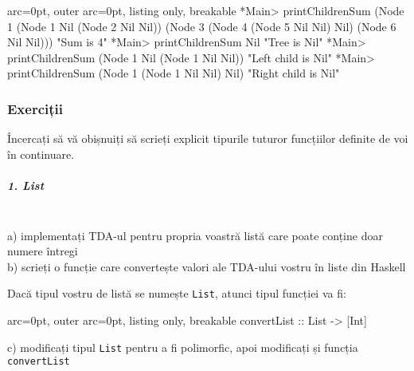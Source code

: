 \begin{tcblisting}{ arc=0pt, outer arc=0pt, listing only, breakable}
*Main> printChildrenSum (Node 1 (Node 1 Nil (Node 2 Nil Nil)) (Node 3 (Node 4 (Node 5 Nil Nil) Nil) (Node 6 Nil Nil)))
"Sum is 4"
*Main> printChildrenSum Nil
"Tree is Nil"
*Main> printChildrenSum (Node 1 Nil (Node 1 Nil Nil))
"Left child is Nil"
*Main> printChildrenSum (Node 1 (Node 1 Nil Nil) Nil)
"Right child is Nil"

\end{tcblisting}


\subsubsection*{ Exerciții }

\begin{tcolorbox}[colback=yellow!40, colframe=yellow!60, breakable]
Încercați să vă obișnuiți să scrieți explicit tipurile tuturor funcțiilor definite de voi în continuare.
\end{tcolorbox}

\subparagraph{ 1. List }\hfill\\

a) implementați TDA-ul pentru propria voastră listă care poate conține doar numere întregi\\b) scrieți o funcție care convertește valori ale TDA-ului vostru în liste din Haskell

\begin{tcolorbox}[colback=cyan!5, colframe=cyan!10, breakable]
Dacă tipul vostru de listă se numește \texttt{List}, atunci tipul funcției va fi: 


\begin{tcblisting}{ arc=0pt, outer arc=0pt, listing only, breakable}
convertList :: List -> [Int]

\end{tcblisting}

\end{tcolorbox}

c) modificați tipul \texttt{List} pentru a fi polimorfic, apoi modificați și funcția \texttt{convertList}

